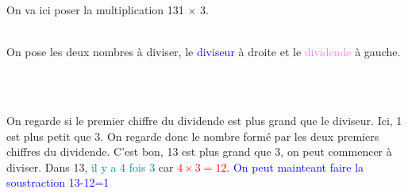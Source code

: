 {On va ici poser la multiplication 131 $\times$ 3.\\\vspace{1em}\\
\begin{minipage}{0.7\textwidth}    
On pose les deux nombres à diviser, le \textcolor{blue}{diviseur} à droite et le \textcolor{violet}{dividende} à gauche.  
\end{minipage}
\hfill
\begin{minipage}{0.22\textwidth}
    \begin{figure}[H]
    \centering
    \end{figure}
\end{minipage}
\\\vspace{1em}\\
\begin{minipage}{0.7\textwidth}    
    On regarde si le premier chiffre du dividende est plus grand que le diviseur. Ici, 1 est plus petit que 3. On regarde donc le nombre formé par les deux premiers chiffres du dividende. C'est bon, 13 est plus grand que 3, on peut commencer à diviser. Dans 13, \textcolor{teal}{il y a 4 fois 3} car \textcolor{red}{$4\times 3=12$}. \textcolor{blue}{On peut mainteant faire la soustraction 13-12=1}
\end{minipage}
\hfill
\begin{minipage}{0.22\textwidth}
    \begin{figure}[H]
    \centering
        \resizebox{\textwidth}{!}{
            \begin{tikzpicture}[scale=0.7]

\end{tikzpicture}}
\end{figure}
\end{minipage}}

